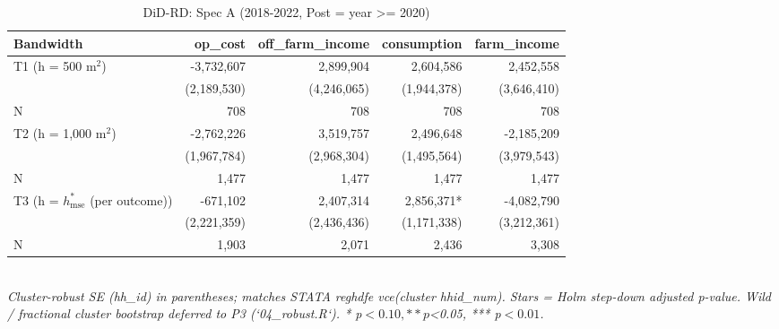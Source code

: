 \begin{table}[t]
\centering
\caption{DiD-RD: Spec A (2018-2022, Post = year >= 2020)}
\label{tab:main_specA_en}
\begin{tabular}{lrrrr}
\toprule
Bandwidth & op\_cost & off\_farm\_income & consumption & farm\_income \\
\midrule
T1 (h = 500 m$^2$) & -3,732,607 & 2,899,904 & 2,604,586 & 2,452,558 \\
        & (2,189,530) & (4,246,065) & (1,944,378) & (3,646,410) \\
N       & 708 & 708 & 708 & 708 \\
T2 (h = 1,000 m$^2$) & -2,762,226 & 3,519,757 & 2,496,648 & -2,185,209 \\
        & (1,967,784) & (2,968,304) & (1,495,564) & (3,979,543) \\
N       & 1,477 & 1,477 & 1,477 & 1,477 \\
T3 (h = $h^{*}_{\mathrm{mse}}$ (per outcome)) & -671,102 & 2,407,314 & 2,856,371* & -4,082,790 \\
        & (2,221,359) & (2,436,436) & (1,171,338) & (3,212,361) \\
N       & 1,903 & 2,071 & 2,436 & 3,308 \\
\bottomrule
\end{tabular}
\\
\footnotesize\textit{Cluster-robust SE (hh\_id) in parentheses; matches STATA reghdfe vce(cluster hhid\_num). Stars = Holm step-down adjusted p-value. Wild / fractional cluster bootstrap deferred to P3 (`04\_robust.R`). * p$<0.10, ** p$<0.05, *** p$<0.01$.}
\end{table}

